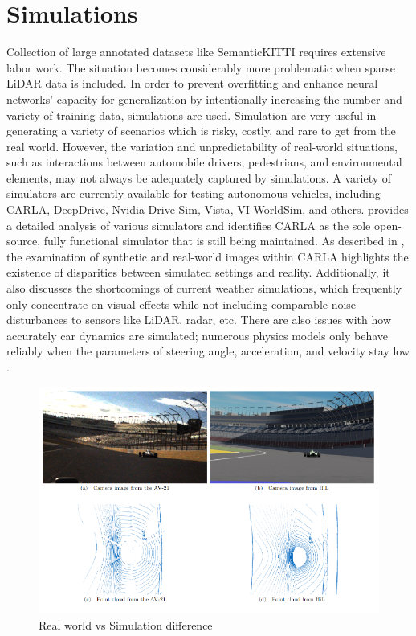 \section{Simulations}
Collection of large annotated datasets like SemanticKITTI requires extensive labor work\parencite{behley2019semantickitti}. The situation becomes considerably more problematic when sparse LiDAR data is included. In order to prevent overfitting and enhance neural networks' capacity for generalization by intentionally increasing the number and variety of training data, simulations are used. Simulation are very useful in generating a variety of scenarios which is risky, costly, and rare to get from the real world. However, the variation and unpredictability of real-world situations, such as interactions between automobile drivers, pedestrians, and environmental elements, may not always be adequately captured by simulations.
A variety of simulators are currently available for testing autonomous vehicles, including CARLA, DeepDrive, Nvidia Drive Sim, Vista, VI-WorldSim, and others. \parencite{li2023choose} provides a detailed analysis of various simulators and identifies CARLA as the sole open-source, fully functional simulator that is still being maintained. As described in \parencite{li2023choose}, the examination of synthetic and real-world images within CARLA highlights the existence of disparities between simulated settings and reality. Additionally, it also discusses the shortcomings of current weather simulations, which frequently only concentrate on visual effects while not including comparable noise disturbances to sensors like LiDAR, radar, etc. There are also issues with how accurately car dynamics are simulated; numerous physics models only behave reliably when the parameters of steering angle, acceleration, and velocity stay low \parencite{7225830}.

\begin{figure}[htbp]
    \centering
    \includegraphics[width=0.8\linewidth]{97_graphics/related_work/real_vs_simulation_difference.pdf}
    \caption{Real world vs Simulation difference \parencite{sauerbeck_learn_Year}}
    \label{fig:related_work-real_vs_simulation}
\end{figure}

